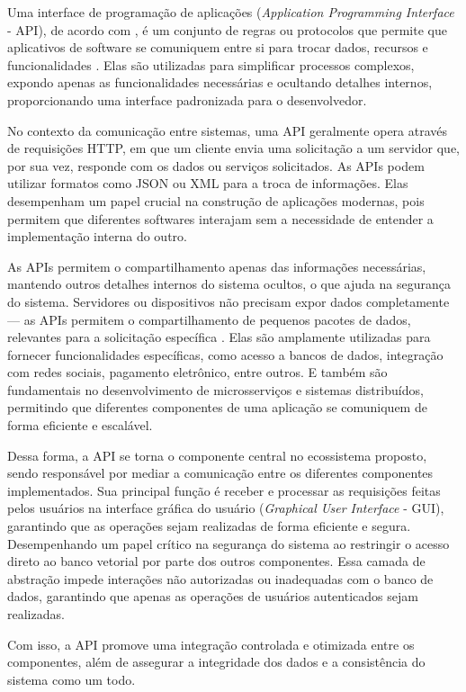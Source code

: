\documentclass[a4paper, 12pt]{article}
\newcommand{\citeb}[1]{\bibleftbracket\cite{#1}\bibrightbracket}
\begin{document}
    Uma interface de programação de aplicações (\textit{Application Programming Interface} - API), de acordo com \citeauthor{ibm_api}, é um conjunto de regras ou protocolos que permite que aplicativos de software se comuniquem entre si para trocar dados, recursos e funcionalidades \citeb{ibm_api}. Elas são utilizadas para simplificar processos complexos, expondo apenas as funcionalidades necessárias e ocultando detalhes internos, proporcionando uma interface padronizada para o desenvolvedor.

    No contexto da comunicação entre sistemas, uma API geralmente opera através de requisições HTTP, em que um cliente envia uma solicitação a um servidor que, por sua vez, responde com os dados ou serviços solicitados. As APIs podem utilizar formatos como JSON ou XML para a troca de informações. Elas desempenham um papel crucial na construção de aplicações modernas, pois permitem que diferentes softwares interajam sem a necessidade de entender a implementação interna do outro.

    As APIs permitem o compartilhamento apenas das informações necessárias, mantendo outros detalhes internos do sistema ocultos, o que ajuda na segurança do sistema. Servidores ou dispositivos não precisam expor dados completamente — as APIs permitem o compartilhamento de pequenos pacotes de dados, relevantes para a solicitação específica \citeb{ibm_api}. Elas são amplamente utilizadas para fornecer funcionalidades específicas, como acesso a bancos de dados, integração com redes sociais, pagamento eletrônico, entre outros. E também são fundamentais no desenvolvimento de microsserviços e sistemas distribuídos, permitindo que diferentes componentes de uma aplicação se comuniquem de forma eficiente e escalável. 
    
    Dessa forma, a API se torna o componente central no ecossistema proposto, sendo responsável por mediar a comunicação entre os diferentes componentes implementados. Sua principal função é receber e processar as requisições feitas pelos usuários na interface gráfica do usuário (\textit{Graphical User Interface} - GUI), garantindo que as operações sejam realizadas de forma eficiente e segura. Desempenhando um papel crítico na segurança do sistema ao restringir o acesso direto ao banco vetorial por parte dos outros componentes. Essa camada de abstração impede interações não autorizadas ou inadequadas com o banco de dados, garantindo que apenas as operações de usuários autenticados sejam realizadas. 
    
    Com isso, a API promove uma integração controlada e otimizada entre os componentes, além de assegurar a integridade dos dados e a consistência do sistema como um todo.
    
\end{document}
